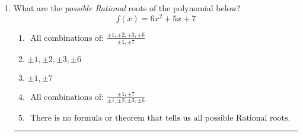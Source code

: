 \documentclass[14pt]{extbook}
\newcommand{\litem}[1]{\item#1\hspace*{-1cm}\rule{\textwidth}{0.4pt}}
\begin{document}
\begin{enumerate}
{\begin{enumerate}[label=\Alph*.]
\end{enumerate} }
\litem{
What are the \textit{possible Rational} roots of the polynomial below?\[ f(x) = 6x^{2} +5 x + 7 \]\begin{enumerate}[label=\Alph*.]
\item \( \text{ All combinations of: }\frac{\pm 1,\pm 2,\pm 3,\pm 6}{\pm 1,\pm 7} \)
\item \( \pm 1,\pm 2,\pm 3,\pm 6 \)
\item \( \pm 1,\pm 7 \)
\item \( \text{ All combinations of: }\frac{\pm 1,\pm 7}{\pm 1,\pm 2,\pm 3,\pm 6} \)
\item \( \text{ There is no formula or theorem that tells us all possible Rational roots.} \)

\end{enumerate} }
\end{enumerate}
\end{document}
